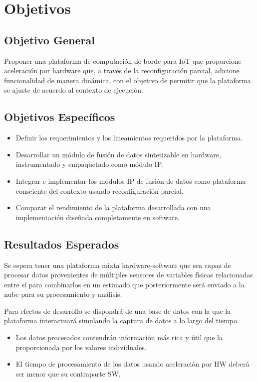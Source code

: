 
\chapter{Objetivos} %
\label{Chapter3}

\section{Objetivo General}

Proponer una plataforma de computación de borde para IoT que proporcione aceleración por hardware que, a través de la reconfiguración parcial, adicione funcionalidad de manera dinámica, con el objetivo de permitir que la plataforma se ajuste de acuerdo al contexto de ejecución.

\section{Objetivos Específicos}
\begin{itemize}
\item Definir los requerimientos y los lineamientos requeridos por la plataforma.
\item Desarrollar un módulo de fusión de datos sintetizable en hardware, instrumentado y empaquetado como módulo IP.
\item Integrar e implementar los módulos IP de fusión de datos como plataforma consciente del contexto usando reconfiguración parcial.
\item Comparar el rendimiento de la plataforma desarrollada con una implementación diseñada completamente en software.
\end{itemize}

\clearpage
\section{Resultados Esperados}
Se espera tener una plataforma mixta hardware-software que sea capaz de procesar datos provenientes de múltiples sensores de variables físicas relacionadas entre sí para combinarlos en un estimado que posteriormente será enviado a la nube para su procesamiento y análisis.

Para efectos de desarrollo se dispondrá de una base de datos con la que la plataforma interactuará simulando la captura de datos a lo largo del tiempo.

\begin{itemize}
\item Los datos procesados contendrán información más rica y útil que la proporcionada por los valores individuales.
\item El tiempo de procesamiento de los datos usando aceleración por HW deberá ser menor que su contraparte SW.
\end{itemize}
